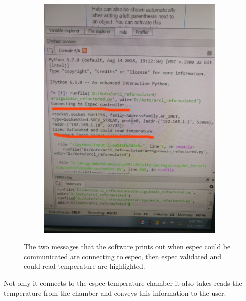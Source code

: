 \documentclass[12pt]{article}
\begin{document}
  
 \begin{figure}[H]
 
    \begin{subfigure}{1.0\textwidth}
    \includegraphics[scale=0.5]{images/espec.png} 
    \label{fig:DJp1}
    \end{subfigure}
 \caption{The two messages that the software prints out  when espec could be communicated are  connecting to espec, then espec validated and could read temperature are highlighted. }
\label{fig6}
\end{figure} 
 
 Not only it connects to the espec temperature chamber it also takes reads the temperature from the chamber and conveys this information to the user. 
 
\end{document}
